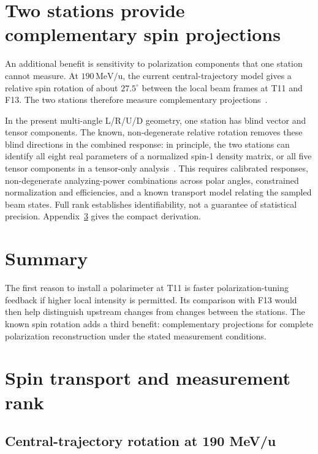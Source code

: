 \documentclass[11pt,a4paper]{article}
\begin{document}
\section{Two stations provide complementary spin projections}\label{sec:projections}

An additional benefit is sensitivity to polarization components that one station cannot measure. At $190\,\mathrm{MeV/u}$, the current central-trajectory model gives a relative spin rotation of about $27.5^\circ$ between the local beam frames at T11 and F13. The two stations therefore measure complementary projections~\cite{local,geometry,bmt,constants}.

In the present multi-angle L/R/U/D geometry, one station has blind vector and tensor components. The known, non-degenerate relative rotation removes these blind directions in the combined response: in principle, the two stations can identify all eight real parameters of a normalized spin-1 density matrix, or all five tensor components in a tensor-only analysis~\cite{local}. This requires calibrated responses, non-degenerate analyzing-power combinations across polar angles, constrained normalization and efficiencies, and a known transport model relating the sampled beam states. Full rank establishes identifiability, not a guarantee of statistical precision. Appendix~\ref{app:transport} gives the compact derivation.

\section{Summary}

The first reason to install a polarimeter at T11 is faster polarization-tuning feedback if higher local intensity is permitted. Its comparison with F13 would then help distinguish upstream changes from changes between the stations. The known spin rotation adds a third benefit: complementary projections for complete polarization reconstruction under the stated measurement conditions.

\clearpage
\appendix
{}
\section{Spin transport and measurement rank}\label{app:transport}

\subsection{Central-trajectory rotation at 190 MeV/u}
\end{document}
